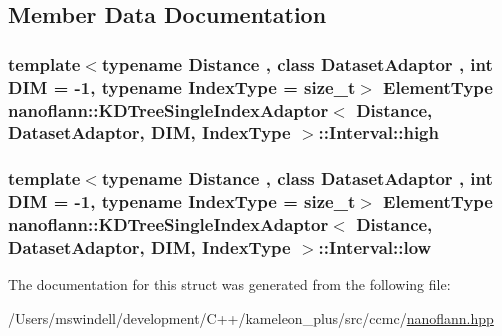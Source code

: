 \subsection{Member Data Documentation}
\hypertarget{structnanoflann_1_1_k_d_tree_single_index_adaptor_1_1_interval_a5b1d4df37a01d6a2154cb89dbd53456e}{
\subsubsection[{high}]{\setlength{\rightskip}{0pt plus 5cm}template$<$typename Distance , class Dataset\-Adaptor , int D\-I\-M = -\/1, typename Index\-Type  = size\-\_\-t$>$ {\bf Element\-Type} {\bf nanoflann\-::\-K\-D\-Tree\-Single\-Index\-Adaptor}$<$ Distance, Dataset\-Adaptor, D\-I\-M, Index\-Type $>$\-::Interval\-::high}}\label{structnanoflann_1_1_k_d_tree_single_index_adaptor_1_1_interval_a5b1d4df37a01d6a2154cb89dbd53456e}
\hypertarget{structnanoflann_1_1_k_d_tree_single_index_adaptor_1_1_interval_a96020845859d090c3f46f1656faeb45d}{
\subsubsection[{low}]{\setlength{\rightskip}{0pt plus 5cm}template$<$typename Distance , class Dataset\-Adaptor , int D\-I\-M = -\/1, typename Index\-Type  = size\-\_\-t$>$ {\bf Element\-Type} {\bf nanoflann\-::\-K\-D\-Tree\-Single\-Index\-Adaptor}$<$ Distance, Dataset\-Adaptor, D\-I\-M, Index\-Type $>$\-::Interval\-::low}}\label{structnanoflann_1_1_k_d_tree_single_index_adaptor_1_1_interval_a96020845859d090c3f46f1656faeb45d}


The documentation for this struct was generated from the following file\-:\begin{DoxyCompactItemize}
\item 
/\-Users/mswindell/development/\-C++/kameleon\-\_\-plus/src/ccmc/\hyperlink{nanoflann_8hpp}{nanoflann.\-hpp}\end{DoxyCompactItemize}
